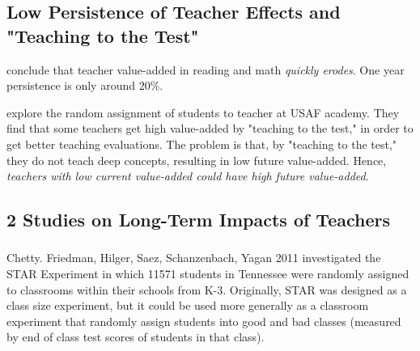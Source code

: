     \subsection{Low Persistence of Teacher Effects and "Teaching to the Test"}

        \cite{jacob_persistence_2008} conclude that teacher value-added in reading and math \emph{quickly erodes}. One year persistence is only around 20\%.

        \cite{carrell_does_2008} explore the random assignment of students to teacher at USAF academy. They find that some teachers get high value-added by "teaching to the test," in order to get better teaching evaluations. The problem is that, by "teaching to the test," they do not teach deep concepts, resulting in low future value-added. Hence, \emph{teachers with low current value-added could have high future value-added}.

    \subsection{2 Studies on Long-Term Impacts of Teachers}

        \subsubsection{\cite{chetty_how_2011}}

            Chetty. Friedman, Hilger, Saez, Schanzenbach, Yagan 2011 investigated the STAR Experiment in which 11571 students in Tennessee were randomly assigned to classrooms within their schools from K-3. Originally, STAR was designed as a class size experiment, but it could be used more generally as a classroom experiment that randomly assign students into good and bad classes (measured by end of class test scores of students in that class).

